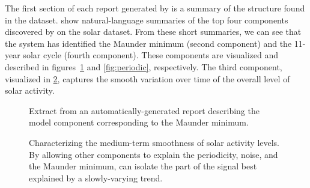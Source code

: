 The first section of each report generated by \procedurename is a summary of the structure found in the dataset.
 show natural-language summaries of the top four components discovered by \procedurename{} on the solar dataset.
From these short summaries, we can see that the system has identified the Maunder minimum (second component) and the 11-year solar cycle (fourth component).
These components are visualized and described in figures~\ref{fig:maunder} and \ref{fig:periodic}, respectively. 
The third component, visualized in \cref{fig:smooth}, captures the smooth variation over time of the overall level of solar activity.
%
\begin{figure}[ht!]%
\centering
{}
\caption[A learned component corresponding to the Maunder minimum]
{Extract from an automatically-generated report describing the model component corresponding to the Maunder minimum.}
\label{fig:maunder}
\end{figure}

\begin{figure}[ht!]
\centering
{}
\caption[\procedurename{} isolating the part of the signal explained by a slowly-varying trend]
{Characterizing the medium-term smoothness of solar activity levels.
By allowing other components to explain the periodicity, noise, and the Maunder minimum, \procedurename{} can isolate the part of the signal best explained by a slowly-varying trend.}
\label{fig:smooth}
\end{figure}

